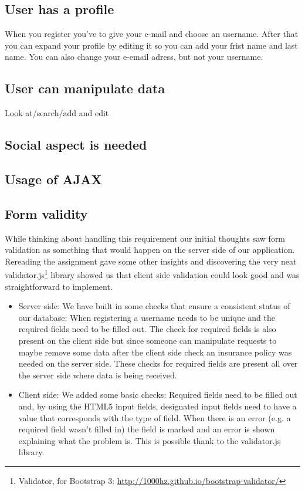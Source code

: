 \documentclass{article}
\begin{document}
\subsection{User has a profile}
When you register you've to give your e-mail and choose an username. After that you can expand your profile by editing it so you can add your frist name and last name. You can also change your e-email adress, but not your username.
\subsection{User can manipulate data}
Look at/search/add and edit

\subsection{Social aspect is needed}

\subsection{Usage of AJAX}

\subsection{Form validity}
While thinking about handling this requirement our initial thoughts saw form validation as something that would happen on the server side of our application. Rereading the assignment gave some other insights and discovering the very neat validator.js\footnote{Validator, for Bootstrap 3: \url{http://1000hz.github.io/bootstrap-validator/} } library showed us that client side validation could look good and was straightforward to implement.
\begin{itemize}
	\item Server side: We have built in some checks that ensure a consistent status of our database: When registering a username needs to be unique and the required fields need to be filled out. The check for required fields is also present on the client side but since someone can manipulate requests to maybe remove some data after the client side check an insurance policy was needed on the server side. These checks for required fields are present all over the server side where data is being received.
	\item Client side: We added some basic checks: Required fields need to be filled out and, by using the HTML5 input fields, designated input fields need to have a value that corresponds with the type of field. When there is an error (e.g. a required field wasn't filled in) the field is marked and an error is shown explaining what the problem is. This is possible thank to the validator.js library.
\end{itemize}
\end{document}
